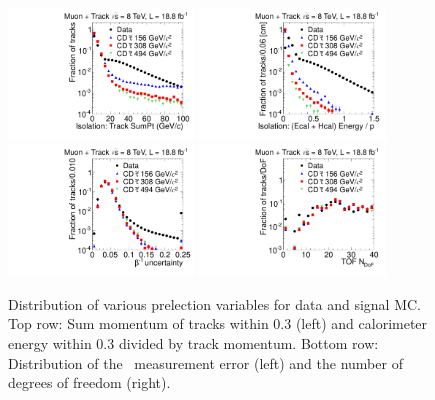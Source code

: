 \begin{figure}
\centering
  \includegraphics[clip=true, trim=0.0cm 0cm 2.8cm 0cm, width=0.44\textwidth]{figures/tkmu/Selection_Comp_8TeV_GMStau_IsolT_BS}
  \includegraphics[clip=true, trim=0.0cm 0cm 2.8cm 0cm, width=0.44\textwidth]{figures/tkmu/Selection_Comp_8TeV_GMStau_IsolE_BS} \\
  \includegraphics[clip=true, trim=0.0cm 0cm 2.8cm 0cm, width=0.44\textwidth]{figures/tkmu/Selection_Comp_8TeV_GMStau_TOFError_BS}
  \includegraphics[clip=true, trim=0.0cm 0cm 2.8cm 0cm, width=0.44\textwidth]{figures/tkmu/Selection_Comp_8TeV_GMStau_nDof_BS}
  \caption{Distribution of various prelection variables for data and signal MC.
Top row: Sum momentum of tracks within 0.3 (left) and calorimeter energy within 0.3 divided by track momentum.
Bottom row: Distribution of the \invbeta\ measurement error (left) and the number of degrees of freedom (right).
    \label{fig:TkMuPreselC}}
\end{figure}

